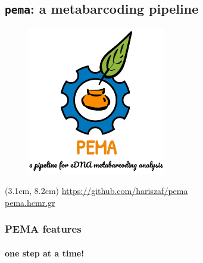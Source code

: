 \documentclass{beamer}
\begin{document}
   \begin{darkframes}

      \subsection{\texttt{pema}: a metabarcoding pipeline}

      \begin{frame}

         \begin{figure}
            \centering
            \includegraphics[width=60mm]{resources/pema_logo.png}         
         \end{figure} 

         \begin{textblock*}{7cm}(3.1cm, 8.2cm)
            \centering
            \href{https://github.com/hariszaf/pema}{https://github.com/hariszaf/pema} \\ 
            \href{http://pema.hcmr.gr}{pema.hcmr.gr}
         \end{textblock*}


      \end{frame}

   \end{darkframes}

   \begin{frame}
      \frametitle{PEMA features}
      \framesubtitle{one step at a time!}
      \begin{singlespace}
      \end{singlespace}
   \end{frame}
\end{document}
